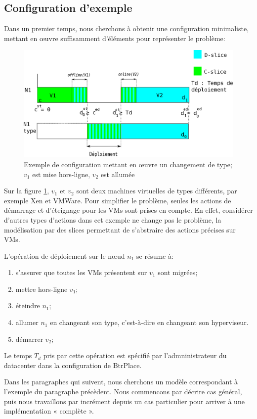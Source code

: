 \documentclass[a4paper]{article}
\begin{document}
\subsection{Configuration d'exemple}
Dans un premier temps, nous cherchons à obtenir une configuration minimaliste,
mettant en œuvre suffisamment d'éléments pour représenter le problème:
\begin{figure}[!ht]
	\centering
	\includegraphics[scale=.45]{imgs/config.eps}
	\caption{\label{config} Exemple de configuration mettant en œuvre un
		changement de type; $v_1$ est mise hors-ligne, $v_2$ est allumée}
\end{figure}

Sur la figure \ref{config}, $v_1$ et $v_2$ sont deux machines
virtuelles de types différents, par exemple Xen et VMWare.
Pour simplifier le problème, seules les actions de démarrage et d'éteignage
pour les VMs sont prises en compte. En effet, considérer
d'autres types d'actions dans cet exemple ne change pas le
problème, la modélisation par des slices permettant de s'abstraire
des actions précises sur VMs.

L'opération de déploiement sur le nœud $n_1$ se résume à:
\begin{enumerate}
	\item s'assurer que toutes les VMs présentent sur $v_1$ sont migrées;
	\item mettre hors-ligne $v_1$;
	\item éteindre $n_1$;
	\item allumer $n_1$ en changeant son type, c'est-à-dire en changeant
		son hyperviseur.
	\item démarrer $v_2$;
\end{enumerate}
Le temps $T_d$ pris par cette opération est spécifié par l'admninistrateur
du datacenter dans la configuration de BtrPlace.

Dans les paragraphes qui suivent, nous cherchons un modèle correspondant
à l'exemple du paragraphe précèdent. Nous commencons par décrire cas général,
puis nous travaillons par incrément depuis un cas particulier pour arriver à une
implémentation « complète ».
\end{document}
